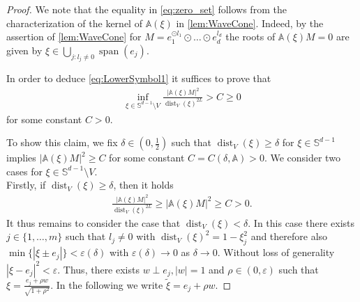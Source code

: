 \documentclass[a4paper, 10pt, twoside, notitlepage]{amsart}
\theoremstyle{plain}
\renewcommand{\AA}{\mathbb{A}}
\DeclareMathOperator{\dist}{dist}
\DeclareMathOperator{\vspan}{span}
\begin{document}
		\begin{proof}

We note that the equality in \cref{eq:zero_set} follows from the characterization of the kernel of $\AA(\xi)$ in \cref{lem:WaveCone}. Indeed, by the assertion of \cref{lem:WaveCone} for $M = e_1^{\odot l_1} \odot \dots \odot e_d^{l_d}$ the roots of $\AA(\xi)M=0$ are given by $\xi \in \bigcup_{j: l_j \neq 0}\vspan(e_j)$.  
		
		
In order to deduce \cref{eq:LowerSymbol1} it suffices to prove that
				\begin{align*}
					\inf_{\xi \in \mathbb{S}^{d-1} \setminus V} \frac{\Big| \AA(\xi) M \Big|^2}{\dist_V(\xi)^{2L}} > C \geq 0
				\end{align*}
				for some constant $C > 0$.  
				
				To show this claim, we fix $\delta \in (0,\frac{1}{2})$
				such that $\dist_V(\xi) \geq \delta$ for
				$\xi \in \mathbb{S}^{d-1}$ implies $|\AA(\xi)M|^2 \geq C$ for some constant $C = C(\delta, \AA) > 0$.  We consider two cases for $\xi \in \mathbb{S}^{d-1} \setminus V$.\\
				Firstly, if $\dist_V(\xi) \geq \delta$, then it holds
					\begin{align*}
						\frac{\Big| \AA(\xi) M \Big|^2}{\dist_V(\xi)^{2L}} \geq \Big| \AA(\xi)M \Big|^2 \geq C > 0.
					\end{align*}
					It thus remains to consider the case that $\dist_V(\xi) < \delta$. In this case there exists $j \in \{1,\dots,m\}$ such that $l_j \neq 0$ with $\dist_V(\xi)^2 = 1 - \xi_j^2$ and therefore also $\min\{|\xi \pm e_j|\} < \varepsilon(\delta)$ with $\varepsilon(\delta) \rightarrow 0$ as $\delta \rightarrow 0$.  Without loss of generality $|\xi - e_j|^2 < \varepsilon$.  Thus,
					there exists $w \perp e_j, |w|=1$ and $\rho \in (0,\varepsilon)$ such that $\xi = \frac{e_{j} + \rho w}{\sqrt{1+\rho^2}}$.  In the following we
					write $\tilde{\xi} = e_j + \rho w$.
					

\end{proof}
\end{document}
